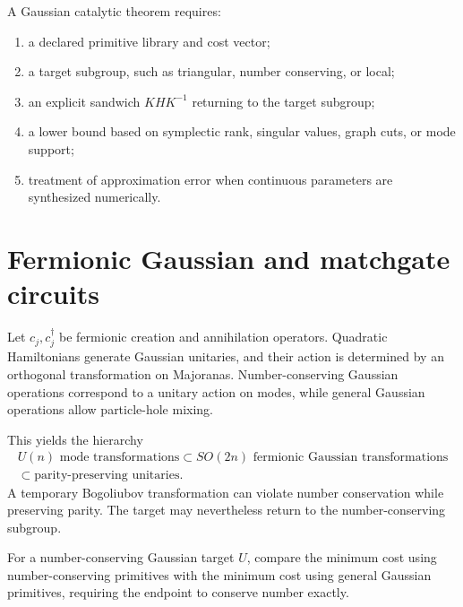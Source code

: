 \begin{skeletonbox}
A Gaussian catalytic theorem requires:
\begin{enumerate}
\item a declared primitive library and cost vector;
\item a target subgroup, such as triangular, number conserving, or local;
\item an explicit sandwich $KHK^{-1}$ returning to the target subgroup;
\item a lower bound based on symplectic rank, singular values, graph cuts, or mode support;
\item treatment of approximation error when continuous parameters are synthesized numerically.
\end{enumerate}
\end{skeletonbox}

\section{Fermionic Gaussian and matchgate circuits}
Let $c_j,c_j^\dagger$ be fermionic creation and annihilation operators.  Quadratic Hamiltonians generate Gaussian unitaries, and their action is determined by an orthogonal transformation on Majoranas.  Number-conserving Gaussian operations correspond to a unitary action on modes, while general Gaussian operations allow particle-hole mixing.

This yields the hierarchy
\[
\begin{gathered}
U(n)\text{ mode transformations}
\subset SO(2n)\text{ fermionic Gaussian transformations}\\
\subset \text{parity-preserving unitaries}.
\end{gathered}
\]
A temporary Bogoliubov transformation can violate number conservation while preserving parity.  The target may nevertheless return to the number-conserving subgroup.

\begin{definition}
For a number-conserving Gaussian target $U$, compare the minimum cost using number-conserving primitives with the minimum cost using general Gaussian primitives, requiring the endpoint to conserve number exactly.
\end{definition}

